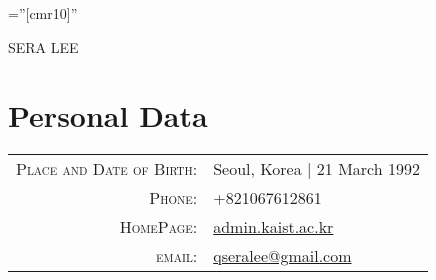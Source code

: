 \documentclass[a4paper,10pt]{article}
\begin{document}

\pagestyle{empty} %

\font\fb=''[cmr10]'' %

\par{\centering
		{\Huge SERA \textsc{LEE}
	}\bigskip\par}

\section{Personal Data}

\begin{tabular}{rl}
    \textsc{Place and Date of Birth:} & Seoul, Korea  | 21 March 1992 \\
    \textsc{Phone:}     & +821067612861\\
    \textsc{HomePage:}     & \href{http://admin.kaist.ac.kr}{admin.kaist.ac.kr}\\
    \textsc{email:}     & \href{mailto:qseralee@gmail.com}{qseralee@gmail.com}
\end{tabular}

\end{document}
